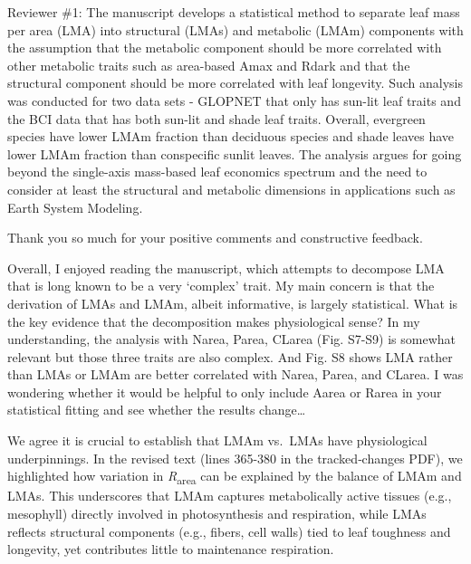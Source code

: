 \documentclass[
  12pt,
  letterpaper,
  DIV=11,
  numbers=noendperiod]{scrartcl}
\renewenvironment{quote}
  {\begin{customblockquote}\color{blockquote-text}\ignorespaces}
  {\end{customblockquote}}
\begin{document}
\begin{quote}
Reviewer \#1: The manuscript develops a statistical method to separate
leaf mass per area (LMA) into structural (LMAs) and metabolic (LMAm)
components with the assumption that the metabolic component should be
more correlated with other metabolic traits such as area-based Amax and
Rdark and that the structural component should be more correlated with
leaf longevity. Such analysis was conducted for two data sets - GLOPNET
that only has sun-lit leaf traits and the BCI data that has both sun-lit
and shade leaf traits. Overall, evergreen species have lower LMAm
fraction than deciduous species and shade leaves have lower LMAm
fraction than conspecific sunlit leaves. The analysis argues for going
beyond the single-axis mass-based leaf economics spectrum and the need
to consider at least the structural and metabolic dimensions in
applications such as Earth System Modeling.
\end{quote}

Thank you so much for your positive comments and constructive feedback.

\begin{quote}
Overall, I enjoyed reading the manuscript, which attempts to decompose
LMA that is long known to be a very `complex' trait. My main concern is
that the derivation of LMAs and LMAm, albeit informative, is largely
statistical. What is the key evidence that the decomposition makes
physiological sense? In my understanding, the analysis with Narea,
Parea, CLarea (Fig. S7-S9) is somewhat relevant but those three traits
are also complex. And Fig. S8 shows LMA rather than LMAs or LMAm are
better correlated with Narea, Parea, and CLarea. I was wondering whether
it would be helpful to only include Aarea or Rarea in your statistical
fitting and see whether the results change\ldots{}
\end{quote}

We agree it is crucial to establish that LMAm vs.~LMAs have
physiological underpinnings. In the revised text (lines 365-380 in the
tracked‐changes PDF), we highlighted how variation in
\emph{R}\textsubscript{area} can be explained by the balance of LMAm and
LMAs. This underscores that LMAm captures metabolically active tissues
(e.g., mesophyll) directly involved in photosynthesis and respiration,
while LMAs reflects structural components (e.g., fibers, cell walls)
tied to leaf toughness and longevity, yet contributes little to
maintenance respiration.
\end{document}
